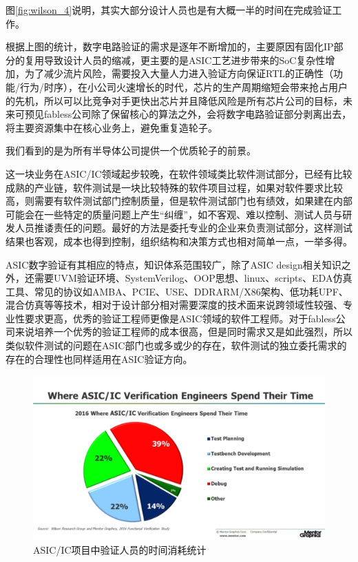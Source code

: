 \documentclass[a4paper,11pt]{article}
\begin{document}
图\ref{fig:wilson_4}说明，其实大部分设计人员也是有大概一半的时间在完成验证工作。

根据上图的统计，数字电路验证的需求是逐年不断增加的，主要原因有固化IP部分的复用导致设计人员的缩减，更主要的是ASIC工艺进步带来的SoC复杂性增加，为了减少流片风险，需要投入大量人力进入验证方向保证RTL的正确性（功能/行为/时序），在小公司火速增长的时代，芯片的生产周期缩短会带来抢占用户的先机，所以可以比竞争对手更快出芯片并且降低风险是所有芯片公司的目标，未来可预见fabless公司除了保留核心的算法之外，会将数字电路验证部分剥离出去，将主要资源集中在核心业务上，避免重复造轮子。

我们看到的是为所有半导体公司提供一个优质轮子的前景。

这一块业务在ASIC/IC领域起步较晚，在软件领域类比软件测试部分，已经有比较成熟的产业链，软件测试是一块比较特殊的软件项目过程，如果对软件要求比较高，则需要有软件测试部门控制质量，但是软件测试部门也有绩效，如果建在内部可能会在一些特定的质量问题上产生“纠缠”，如不客观、难以控制、测试人员与研发人员推诿责任的问题。最好的方法是委托专业的企业来负责测试部分，这样测试结果也客观，成本也得到控制，组织结构和决策方式也相对简单一点，一举多得。

ASIC数字验证有其相应的特点，知识体系范围较广，除了ASIC design相关知识之外，还需要UVM验证环境、SystemVerilog、OOP思想、linux、scripts、EDA仿真工具、常见的协议如AMBA、PCIE、USE、DDRARM/X86架构、低功耗UPF、混合仿真等等技术，相对于设计部分相对需要深度的技术面来说跨领域性较强、专业性要求更高，优秀的验证工程师更像是ASIC领域的软件工程师。对于fabless公司来说培养一个优秀的验证工程师的成本很高，但是同时需求又是如此强烈，所以类似软件测试的问题在ASIC部门也或多或少的存在，软件测试的独立委托需求的存在的合理性也同样适用在ASIC验证方向。

\begin{figure}[ht]
  \centering
  \includegraphics[width=0.8\linewidth]{images/wilson5.png}
  \caption{ASIC/IC项目中验证人员的时间消耗统计}
  \label{fig:wilson_5}
\end{figure}
\end{document}
